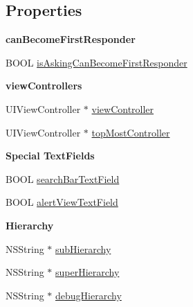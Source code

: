 \subsection*{Properties}
\begin{Indent}\textbf{ can\+Become\+First\+Responder}\par
{\em 

 

 }\begin{DoxyCompactItemize}
\item 
B\+O\+OL \mbox{\hyperlink{category_u_i_view_07_i_q___u_i_view___hierarchy_08_ac12fd97ed15b737516ff9773ff83aa5c}{is\+Asking\+Can\+Become\+First\+Responder}}
\end{DoxyCompactItemize}
\end{Indent}
\begin{Indent}\textbf{ view\+Controllers}\par
{\em 

 

 }\begin{DoxyCompactItemize}
\item 
U\+I\+View\+Controller $\ast$ \mbox{\hyperlink{category_u_i_view_07_i_q___u_i_view___hierarchy_08_a3b2875c16bd6e5e31ee571c1a0236dac}{view\+Controller}}
\item 
U\+I\+View\+Controller $\ast$ \mbox{\hyperlink{category_u_i_view_07_i_q___u_i_view___hierarchy_08_afa4722598f368a57d40b54ab60332604}{top\+Most\+Controller}}
\end{DoxyCompactItemize}
\end{Indent}
\begin{Indent}\textbf{ Special Text\+Fields}\par
{\em 

 

 }\begin{DoxyCompactItemize}
\item 
B\+O\+OL \mbox{\hyperlink{category_u_i_view_07_i_q___u_i_view___hierarchy_08_a31afafe614a49e3a5e60594910b13458}{search\+Bar\+Text\+Field}}
\item 
B\+O\+OL \mbox{\hyperlink{category_u_i_view_07_i_q___u_i_view___hierarchy_08_a31b35b61ef35c815f905860d1b9a263f}{alert\+View\+Text\+Field}}
\end{DoxyCompactItemize}
\end{Indent}
\begin{Indent}\textbf{ Hierarchy}\par
{\em 

 

 }\begin{DoxyCompactItemize}
\item 
N\+S\+String $\ast$ \mbox{\hyperlink{category_u_i_view_07_i_q___u_i_view___hierarchy_08_a0cfd7f44071a2906d56e60c4e91b40a4}{sub\+Hierarchy}}
\item 
N\+S\+String $\ast$ \mbox{\hyperlink{category_u_i_view_07_i_q___u_i_view___hierarchy_08_a58a7a2ce91973e9df4cfe793adc632b5}{super\+Hierarchy}}
\item 
N\+S\+String $\ast$ \mbox{\hyperlink{category_u_i_view_07_i_q___u_i_view___hierarchy_08_a9bdc23e7d4cae933952e94f2eb8ee55c}{debug\+Hierarchy}}
\end{DoxyCompactItemize}
\end{Indent}
